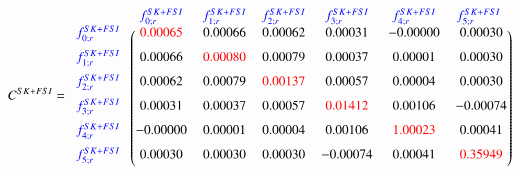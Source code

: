 {
\small
\begin{equation}
C^{SK+FSI} = 
\begin{blockarray}{c cccccc}
                  &       {\color{blue} f_{0; r}^{SK+FSI}} &       {\color{blue} f_{1; r}^{SK+FSI}} &       {\color{blue} f_{2; r}^{SK+FSI}} &       {\color{blue} f_{3; r}^{SK+FSI}} &       {\color{blue} f_{4; r}^{SK+FSI}} &       {\color{blue} f_{5; r}^{SK+FSI}} \\ 
\begin{block}{c(cccccc@{\hspace*{2pt}})}
      {\color{blue} f_{0; r}^{SK+FSI}}  \vspace{0.2cm} &        {\color{red} 0.00065} &              0.00066 &              0.00062 &              0.00031 &             -0.00000 &              0.00030 \\ 
      {\color{blue} f_{1; r}^{SK+FSI}}  \vspace{0.2cm} &              0.00066 &        {\color{red} 0.00080} &              0.00079 &              0.00037 &              0.00001 &              0.00030 \\ 
      {\color{blue} f_{2; r}^{SK+FSI}}  \vspace{0.2cm} &              0.00062 &              0.00079 &        {\color{red} 0.00137} &              0.00057 &              0.00004 &              0.00030 \\ 
      {\color{blue} f_{3; r}^{SK+FSI}}  \vspace{0.2cm} &              0.00031 &              0.00037 &              0.00057 &        {\color{red} 0.01412} &              0.00106 &             -0.00074 \\ 
      {\color{blue} f_{4; r}^{SK+FSI}}  \vspace{0.2cm} &             -0.00000 &              0.00001 &              0.00004 &              0.00106 &        {\color{red} 1.00023} &              0.00041 \\ 
      {\color{blue} f_{5; r}^{SK+FSI}}  \vspace{0.2cm} &              0.00030 &              0.00030 &              0.00030 &             -0.00074 &              0.00041 &        {\color{red} 0.35949} \\ 
\end{block}
\label{eq:Cskfsi}
\end{blockarray}
\end{equation}
\normalsize
}
